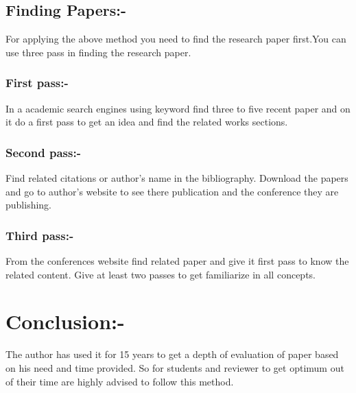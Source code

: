 \documentclass{article}
\begin{document}
\subsection{Finding Papers:-}
For applying the above method you need to find the research paper first.You can use three pass in finding the research paper. 
\subsubsection{First pass:- }
In a academic search engines using keyword find three to five recent paper and on it do a first pass to get an idea and find the related works sections.
\subsubsection{Second pass:- }
Find related citations or author's name in the bibliography. Download the papers and go to author's website to see there publication and the conference they are publishing.
\subsubsection{Third pass:-}
From the conferences website find related paper and give it first pass to know the related content. Give at least two passes to get familiarize in all concepts.
\section{Conclusion:-}
The author has used it for 15 years to get a depth of evaluation of paper based on his need and time provided. So for students and reviewer to get optimum out of their time are highly advised to follow this method.
\end{document}
